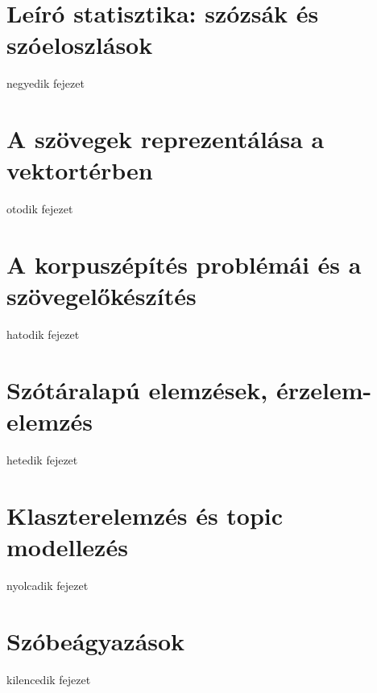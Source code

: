 \documentclass[
]{book}
\begin{document}
\hypertarget{leuxedruxf3-statisztika-szuxf3zsuxe1k-uxe9s-szuxf3eloszluxe1sok}{%
\chapter{Leíró statisztika: szózsák és
szóeloszlások}\label{leuxedruxf3-statisztika-szuxf3zsuxe1k-uxe9s-szuxf3eloszluxe1sok}}

negyedik fejezet

\hypertarget{a-szuxf6vegek-reprezentuxe1luxe1sa-a-vektortuxe9rben}{%
\chapter{A szövegek reprezentálása a
vektortérben}\label{a-szuxf6vegek-reprezentuxe1luxe1sa-a-vektortuxe9rben}}

otodik fejezet

\hypertarget{a-korpuszuxe9puxedtuxe9s-probluxe9muxe1i-uxe9s-a-szuxf6vegelux151kuxe9szuxedtuxe9s}{%
\chapter{A korpuszépítés problémái és a
szövegelőkészítés}\label{a-korpuszuxe9puxedtuxe9s-probluxe9muxe1i-uxe9s-a-szuxf6vegelux151kuxe9szuxedtuxe9s}}

hatodik fejezet

\hypertarget{szuxf3tuxe1ralapuxfa-elemzuxe9sek-uxe9rzelem-elemzuxe9s}{%
\chapter{Szótáralapú elemzések,
érzelem-elemzés}\label{szuxf3tuxe1ralapuxfa-elemzuxe9sek-uxe9rzelem-elemzuxe9s}}

hetedik fejezet

\hypertarget{klaszterelemzuxe9s-uxe9s-topic-modellezuxe9s}{%
\chapter{Klaszterelemzés és topic
modellezés}\label{klaszterelemzuxe9s-uxe9s-topic-modellezuxe9s}}

nyolcadik fejezet

\hypertarget{szuxf3beuxe1gyazuxe1sok}{%
\chapter{Szóbeágyazások}\label{szuxf3beuxe1gyazuxe1sok}}

kilencedik fejezet
\end{document}
